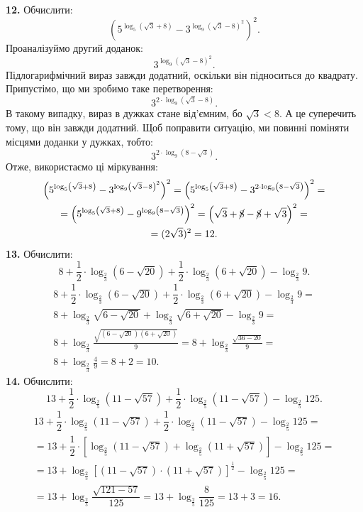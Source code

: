\textbf{12.} Обчислити:
$$
\left(5^{\log_{5}\left(\sqrt{3}+8\right)}-3^{\log_{9}\left(\sqrt{3}-8\right)^2}\right)^2.
$$
Проаналізуймо другий доданок:
$$
3^{\log_{9}\left(\sqrt{3}-8\right)^2}.
$$
Підлогарифмічний вираз завжди додатний, оскільки він підноситься до квадрату. Припустімо, що ми
зробимо таке перетворення:
$$
3^{2\cdot\log_{9}\left(\sqrt{3}-8\right)}.
$$
В такому випадку, вираз в дужках стане від'ємним, бо $\sqrt{3}<8$. А це суперечить тому, що
він завжди додатний. Щоб поправити ситуацію, ми повинні поміняти місцями доданки у дужках, тобто:
$$
3^{2\cdot\log_{9}\left(8-\sqrt{3}\right)}.
$$
Отже, використаємо ці міркування:
\begin{multline*}
\left(5^{\log_{5}\left(\sqrt{3}+8\right)}-3^{\log_{9}\left(\sqrt{3}-8\right)^2}\right)^2=
\left(5^{\log_{5}\left(\sqrt{3}+8\right)}-3^{2\cdot\log_{9}\left(8-\sqrt{3}\right)}\right)^2=\\
=\left(5^{\log_{5}\left(\sqrt{3}+8\right)}-9^{\log_{9}\left(8-\sqrt{3}\right)}\right)^2=
\left(\sqrt{3}+\cancel{8}-\cancel{8}+\sqrt{3}\right)^2=\\
=(2\sqrt{3})^2=12.
\end{multline*}
\textbf{13.} Обчислити:
$$
8+\dfrac{1}{2}\cdot\log_{\frac{2}{3}}\left(6-\sqrt{20}\right)+\dfrac{1}{2}\cdot\log_{\frac{2}{3}} \left(6+\sqrt{20}\right)-\log_{\frac{2}{3}}9.
$$
\begin{multline*}
8+\dfrac{1}{2}\cdot\log_{\frac{2}{3}}\left(6-\sqrt{20}\right)+\dfrac{1}{2}\cdot\log_{\frac{2}{3}} \left(6+\sqrt{20}\right)-\log_{\frac{2}{3}}9=\\
8+\log_{\frac{2}{3}}\sqrt{6-\sqrt{20}}+\log_{\frac{2}{3}}\sqrt{6+\sqrt{20}}-\log_{\frac{2}{3}}9=\\
8+\log_{\frac{2}{3}}\frac{\sqrt{\left(6-\sqrt{20}\right)\left(6+\sqrt{20}\right)}}{9}=
8+\log_{\frac{2}{3}}\frac{\sqrt{36-20}}{9}=\\
8+\log_{\frac{2}{3}}\frac{4}{9}=8+2=10.
\end{multline*}
\textbf{14.} Обчислити:
$$
13+\dfrac{1}{2}\cdot\log_{\frac{2}{5}}\left(11-\sqrt{57}\right)+\dfrac{1}{2}\cdot\log_{\frac{2}{5}}\left(11-\sqrt{57}\right)-\log_{\frac{2}{5}}125.
$$
\begin{multline*}
13+\dfrac{1}{2}\cdot\log_{\frac{2}{5}}\left(11-\sqrt{57}\right)+\dfrac{1}{2}\cdot\log_{\frac{2}{5}}\left(11-\sqrt{57}\right)-\log_{\frac{2}{5}}125=\\
=13+\dfrac{1}{2}\cdot\left[\log_{\frac{2}{5}}\left(11-\sqrt{57}\right)+\log_{\frac{2}{5}}\left(11+\sqrt{57}\right)\right]-\log_{\frac{2}{5}}125=\\
=13+\log_{\frac{2}{5}}\left[\left(11-\sqrt{57}\right)\cdot\left(11+\sqrt{57}\right)\right]^{\frac{1}{2}}-\log_{\frac{2}{5}}125=\\
=13+\log_{\frac{2}{5}}\dfrac{\sqrt{121-57}}{125}=
13+\log_{\frac{2}{5}}\dfrac{8}{125}=
13+3=16.
\end{multline*}
